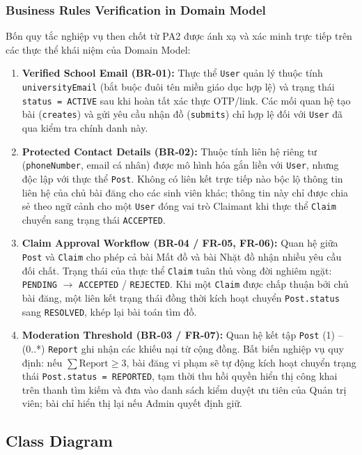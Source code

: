 \subsubsection{Business Rules Verification in Domain Model}

Bốn quy tắc nghiệp vụ then chốt từ PA2 được ánh xạ và xác minh trực tiếp trên các thực thể khái niệm của Domain Model:

\begin{enumerate}[label=\arabic*.,leftmargin=1.5em,itemsep=5pt]
  \item \textbf{Verified School Email (BR-01):} Thực thể \texttt{User} quản lý thuộc tính \texttt{universityEmail} (bắt buộc đuôi tên miền giáo dục hợp lệ) và trạng thái \texttt{status = ACTIVE} sau khi hoàn tất xác thực OTP/link. Các mối quan hệ tạo bài (\texttt{creates}) và gửi yêu cầu nhận đồ (\texttt{submits}) chỉ hợp lệ đối với \texttt{User} đã qua kiểm tra chính danh này.
  \item \textbf{Protected Contact Details (BR-02):} Thuộc tính liên hệ riêng tư (\texttt{phoneNumber}, email cá nhân) được mô hình hóa gắn liền với \texttt{User}, nhưng độc lập với thực thể \texttt{Post}. Không có liên kết trực tiếp nào bộc lộ thông tin liên hệ của chủ bài đăng cho các sinh viên khác; thông tin này chỉ được chia sẻ theo ngữ cảnh cho một \texttt{User} đóng vai trò Claimant khi thực thể \texttt{Claim} chuyển sang trạng thái \texttt{ACCEPTED}.
  \item \textbf{Claim Approval Workflow (BR-04 / FR-05, FR-06):} Quan hệ giữa \texttt{Post} và \texttt{Claim} cho phép cả bài Mất đồ và bài Nhặt đồ nhận nhiều yêu cầu đối chất. Trạng thái của thực thể \texttt{Claim} tuân thủ vòng đời nghiêm ngặt: \texttt{PENDING} $\rightarrow$ \texttt{ACCEPTED} / \texttt{REJECTED}. Khi một \texttt{Claim} được chấp thuận bởi chủ bài đăng, một liên kết trạng thái đồng thời kích hoạt chuyển \texttt{Post.status} sang \texttt{RESOLVED}, khép lại bài toán tìm đồ.
  \item \textbf{Moderation Threshold (BR-03 / FR-07):} Quan hệ kết tập \texttt{Post} (1) -- (0..*) \texttt{Report} ghi nhận các khiếu nại từ cộng đồng. Bất biến nghiệp vụ quy định: nếu $\sum \text{Report} \ge 3$, bài đăng vi phạm sẽ tự động kích hoạt chuyển trạng thái \texttt{Post.status = REPORTED}, tạm thời thu hồi quyền hiển thị công khai trên thanh tìm kiếm và đưa vào danh sách kiểm duyệt ưu tiên của Quản trị viên; bài chỉ hiển thị lại nếu Admin quyết định giữ.
\end{enumerate}

\subsection{Class Diagram}\label{ood-class-diagram}

